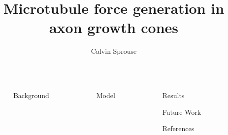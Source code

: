 \documentclass[final]{beamer}
\title{Microtubule force generation in axon growth cones}
\author{Calvin Sprouse}
\institute[CWU]{Department of Physics, Central Washington University}
\newlength{\sepwidth}
\newlength{\colwidth}
\newcommand{\separatorcolumn}{\begin{column}{\sepwidth}\end{column}}
\begin{document}
\begin{frame}[t]
\begin{columns}[t]
\separatorcolumn%


\begin{column}{\colwidth}

\begin{block}{Background}
\end{block}

\end{column}
\separatorcolumn%


\begin{column}{\colwidth}

\begin{block}{Model}
\end{block}

\end{column}
\separatorcolumn%


\begin{column}{\colwidth}

\begin{block}{Results}
\end{block}

\begin{block}{Future Work}
\end{block}

\begin{block}{References}
\footnotesize{
    
    
}
\end{block}

\end{column}
\separatorcolumn%

\end{columns}
\end{frame}
\end{document}
